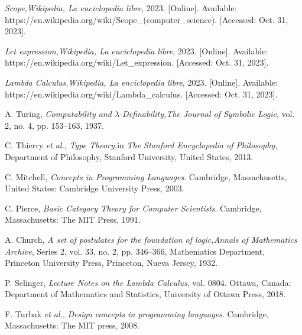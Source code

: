 \begin{thebibliography}{11}
    \label{sec:80}
    \hypertarget{80}{}
    \textit{Scope,}\textit{Wikipedia, La enciclopedia libre}, 2023. [Online]. Available: https://en.wikipedia.org/wiki/Scope\_(computer\_science). [Accessed: Oct. 31, 2023].
    
    \label{sec:81}
    \hypertarget{81}{}
    \textit{Let expression,}\textit{Wikipedia, La enciclopedia libre}, 2023. [Online]. Available: https://en.wikipedia.org/wiki/Let\_expression. [Accessed: Oct. 31, 2023].

    \label{sec:82}
    \hypertarget{82}{}
    \textit{Lambda Calculus,}\textit{Wikipedia, La enciclopedia libre}, 2023. [Online]. Available: https://en.wikipedia.org/wiki/Lambda\_calculus. [Accessed: Oct. 31, 2023].

    \label{sec:83}
    \hypertarget{83}{}
    A. Turing, \textit{Computability and $\lambda$-Definability,}\textit{The Journal of Symbolic Logic}, vol. 2, no. 4, pp. 153–163, 1937.

    \label{sec:84}
    \hypertarget{84}{}
    C. Thierry \textit{et al.}, \textit{Type Theory,}in \textit{The Stanford Encyclopedia of Philosophy}, Department of Philosophy, Stanford University, United States, 2013.
    
    \label{sec:85}
    \hypertarget{85}{}
    C. Mitchell, \textit{Concepts in Programming Languages}. Cambridge, Massachusetts, United States: Cambridge University Press, 2003.

    \label{sec:86}
    \hypertarget{86}{}
    C. Pierce, \textit{Basic Category Theory for Computer Scientists}. Cambridge, Massachusetts: The MIT Press, 1991.

    \label{sec:87}
    \hypertarget{87}{}
    A. Church, \textit{A set of postulates for the foundation of logic,}\textit{Annals of Mathematics Archive}, Series 2, vol. 33, no. 2, pp. 346–366, Mathematics Department, Princeton University Press, Princeton, Nueva Jersey, 1932.

    \label{sec:88}
    \hypertarget{88}{}
    P. Selinger, \textit{Lecture Notes on the Lambda Calculus}, vol. 0804. Ottawa, Canada: Department of Mathematics and Statistics, University of Ottawa Press, 2018.

    \label{sec:89}
    \hypertarget{89}{}
    F. Turbak \textit{et al.}, \textit{Design concepts in programming languages}. Cambridge, Massachusetts: The MIT press, 2008.


\end{thebibliography}
